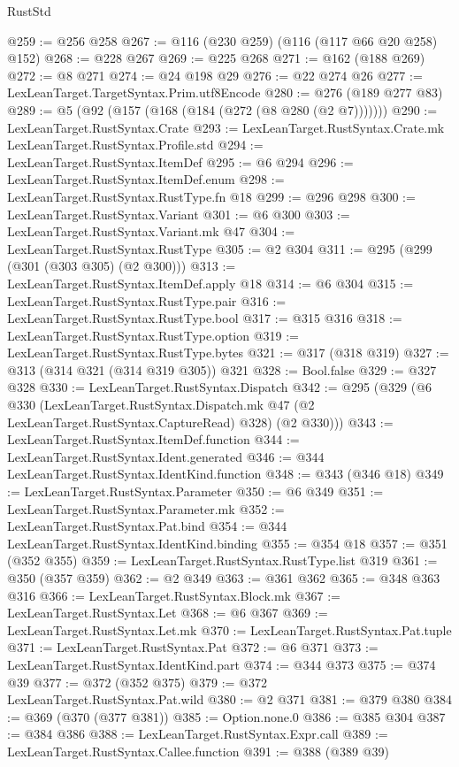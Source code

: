 \begin{lexlean}{RustStd}
\begin{coremodule}
{\begin{coremodule}
{{{{{{{{{{@259 := @256 @258
@267 := @116 (@230 @259) (@116 (@117 @66 @20 @258) @152)
@268 := @228 @267
@269 := @225 @268
@271 := @162 (@188 @269)
@272 := @8 @271
@274 := @24 @198 @29
@276 := @22 @274 @26
@277 := LexLeanTarget.TargetSyntax.Prim.utf8Encode
@280 := @276 (@189 @277 @83)
@289 := @5 (@92 (@157 (@168 (@184 (@272 (@8 @280 (@2 @7)))))))
@290 := LexLeanTarget.RustSyntax.Crate
@293 := LexLeanTarget.RustSyntax.Crate.mk LexLeanTarget.RustSyntax.Profile.std
@294 := LexLeanTarget.RustSyntax.ItemDef
@295 := @6 @294
@296 := LexLeanTarget.RustSyntax.ItemDef.enum
@298 := LexLeanTarget.RustSyntax.RustType.fn @18
@299 := @296 @298
@300 := LexLeanTarget.RustSyntax.Variant
@301 := @6 @300
@303 := LexLeanTarget.RustSyntax.Variant.mk @47
@304 := LexLeanTarget.RustSyntax.RustType
@305 := @2 @304
@311 := @295 (@299 (@301 (@303 @305) (@2 @300)))
@313 := LexLeanTarget.RustSyntax.ItemDef.apply @18
@314 := @6 @304
@315 := LexLeanTarget.RustSyntax.RustType.pair
@316 := LexLeanTarget.RustSyntax.RustType.bool
@317 := @315 @316
@318 := LexLeanTarget.RustSyntax.RustType.option
@319 := LexLeanTarget.RustSyntax.RustType.bytes
@321 := @317 (@318 @319)
@327 := @313 (@314 @321 (@314 @319 @305)) @321
@328 := Bool.false
@329 := @327 @328
@330 := LexLeanTarget.RustSyntax.Dispatch
@342 := @295
    (@329
      (@6
        @330
        (LexLeanTarget.RustSyntax.Dispatch.mk @47 (@2 LexLeanTarget.RustSyntax.CaptureRead) @328)
        (@2 @330)))
@343 := LexLeanTarget.RustSyntax.ItemDef.function
@344 := LexLeanTarget.RustSyntax.Ident.generated
@346 := @344 LexLeanTarget.RustSyntax.IdentKind.function
@348 := @343 (@346 @18)
@349 := LexLeanTarget.RustSyntax.Parameter
@350 := @6 @349
@351 := LexLeanTarget.RustSyntax.Parameter.mk
@352 := LexLeanTarget.RustSyntax.Pat.bind
@354 := @344 LexLeanTarget.RustSyntax.IdentKind.binding
@355 := @354 @18
@357 := @351 (@352 @355)
@359 := LexLeanTarget.RustSyntax.RustType.list @319
@361 := @350 (@357 @359)
@362 := @2 @349
@363 := @361 @362
@365 := @348 @363 @316
@366 := LexLeanTarget.RustSyntax.Block.mk
@367 := LexLeanTarget.RustSyntax.Let
@368 := @6 @367
@369 := LexLeanTarget.RustSyntax.Let.mk
@370 := LexLeanTarget.RustSyntax.Pat.tuple
@371 := LexLeanTarget.RustSyntax.Pat
@372 := @6 @371
@373 := LexLeanTarget.RustSyntax.IdentKind.part
@374 := @344 @373
@375 := @374 @39
@377 := @372 (@352 @375)
@379 := @372 LexLeanTarget.RustSyntax.Pat.wild
@380 := @2 @371
@381 := @379 @380
@384 := @369 (@370 (@377 @381))
@385 := Option.none.{0}
@386 := @385 @304
@387 := @384 @386
@388 := LexLeanTarget.RustSyntax.Expr.call
@389 := LexLeanTarget.RustSyntax.Callee.function
@391 := @388 (@389 @39)
}}}}}}}}}}
\end{coremodule}}
\end{coremodule}
\end{lexlean}
